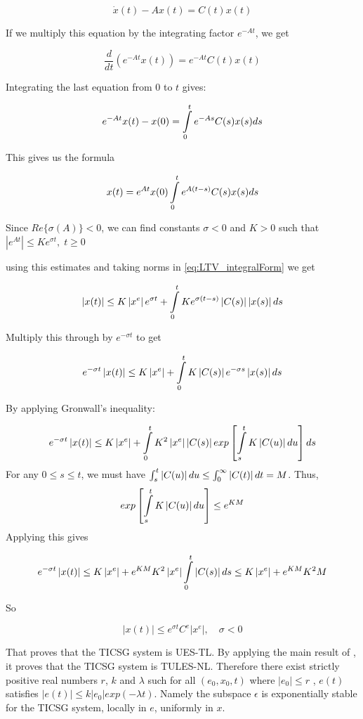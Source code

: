 \documentclass[letterpaper, 10 pt, conference]{ieeeconf}  %
\begin{document}
\[
\dot{x}(t)-Ax(t)=C(t)x(t)
\]

If we multiply this equation by the integrating factor
$e^{-At}$, we get 

\[
\frac{d}{dt}\left(e^{-At}x(t)\right)=e^{-At}C(t)x(t)
\]

Integrating the last equation from $0$ to $t$ gives:

\[
e^{-At}x(t)-x(0)=\intop_{0}^{t}e^{-As}C(s)x(s)ds
\]

This gives us the formula

\begin{equation}
x(t)=e^{At}x(0)\intop_{0}^{t}e^{A(t-s)}C(s)x(s)ds\label{eq:LTV_integralForm}
\end{equation}

Since $Re\{\sigma(A)\}<0$, we can find constants $\sigma<0$ and
$K>0$ such that $\left|e^{At}\right|\leq Ke^{\sigma t},\;t\geq0$ 

using this estimates and taking norms in \eqref{eq:LTV_integralForm}
we get 

\[
\left|x(t)\right|\leq K\left|x^{e}\right|e^{\sigma t}+\intop_{0}^{t}Ke^{\sigma(t-s)}\left|C(s)\right|\left|x(s)\right|ds
\]

Multiply this through by $e^{-\sigma t}$ to get

\[
e^{-\sigma t}\left|x(t)\right|\leq K\left|x^{e}\right|+\intop_{0}^{t}K\left|C(s)\right|e^{-\sigma s}\left|x(s)\right|ds
\]

By applying Gronwall's inequality:

\[
e^{-\sigma t}\left|x(t)\right|\leq K\left|x^{e}\right|+\intop_{0}^{t}K^{2}\left|x^{e}\right|\left|C(s)\right|exp\left[\intop_{s}^{t}K\left|C(u)\right|du\right]ds
\]
For any $0\le s\le t$, we must have $\intop_{s}^{t}\left|C(u)\right|du\le\intop_{0}^{\infty}\left|C(t)\right|dt=M$.
Thus, 
\[
exp\left[\intop_{s}^{t}K\left|C(u)\right|du\right]\le e^{KM}
\]
Applying this gives

\[
e^{-\sigma t}\left|x(t)\right|\leq K\left|x^{e}\right|+e^{KM}K^{2}\left|x^{e}\right|\intop_{0}^{t}\left|C(s)\right|ds\le K\left|x^{e}\right|+e^{KM}K^{2}M
\]

So 

\[
\left|x(t)\right|\leq e^{\sigma t}C^{e}\left|x^{e}\right|,\quad\sigma<0
\]

That proves that the TICSG system is UES-TL. By applying
the main result of \cite{AndrieuJayawardhanaPraly}, it proves that the TICSG system is TULES-NL.
Therefore there exist strictly positive real numbers $r$, $k$
and $\lambda$ such for all $(e_0,x_0,t)$ where $\left| e_0 \right| \le r $
, $e(t)$ satisfies $\left|e(t)\right|\leq k\left|e_0 \right|exp(-\lambda t)$.
Namely the subspace $\epsilon$ is exponentially stable for the TICSG system, locally in $e$, uniformly in $x$.
\end{document}
